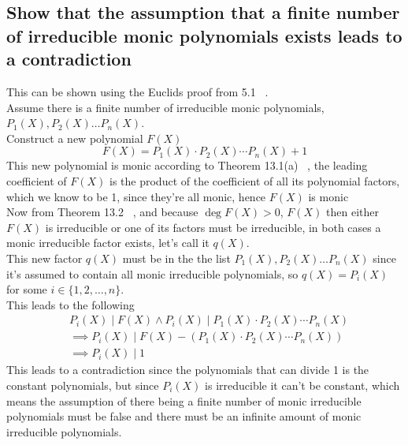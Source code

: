 \documentclass[12pt]{article}
\begin{document}
\subsection*{Show that the assumption that a finite number of irreducible monic polynomials exists leads to a contradiction}
This can be shown using the Euclids proof from 5.1 ~\cite{Algebra}.\\
Assume there is a finite number of irreducible monic polynomials, $P_1(X),P_2(X)\hdots P_n(X)$.\\
Construct a new polynomial $F(X)$
\begin{equation*}
    F(X) = P_1(X) \cdot P_2(X) \cdots P_n(X) + 1
\end{equation*} 
This new polynomial is monic according to Theorem 13.1(a) ~\cite{Algebra}, the leading coefficient of $F(X)$ is the product of the coefficient of all its polynomial factors, which we know to be 1, since they're all monic, hence $F(X)$ is monic\\
Now from Theorem 13.2 ~\cite{Algebra}, and because $\deg F(X) > 0$, $F(X)$ then either $F(X)$ is irreducible or one of its factors must be irreducible, in both cases a monic irreducible factor exists, let's call it $q(X)$.\\
\newline
This new factor $q(X)$ must be in the the list $P_1(X),P_2(X)\hdots P_n(X)$ since it's assumed to contain all monic irreducible polynomials, so $q(X) = P_i(X)$ for some $ i \in \{1,2, \hdots ,n\}$.\\
This leads to the following
\begin{align*}
    & P_i(X) \mid F(X) \land P_i(X) \mid P_1(X) \cdot P_2(X) \cdots P_n(X) \\
    & \implies P_i(X) \mid F(X) - (P_1(X) \cdot P_2(X) \cdots P_n(X)) \\
    & \implies P_i(X) \mid 1
\end{align*}
This leads to a contradiction since the polynomials that can divide 1 is the constant polynomials, but since $P_i(X)$ is irreducible it can't be constant, which means the assumption of there being a finite number of monic irreducible polynomials must be false and there must be an infinite amount of monic irreducible polynomials.

\printbibliography
\end{document}
